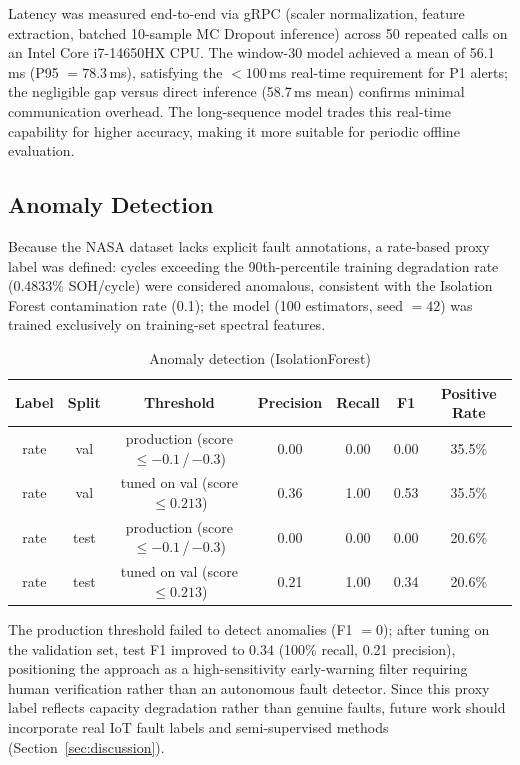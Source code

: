 Latency was measured end-to-end via gRPC (scaler normalization, feature
extraction, batched 10-sample MC Dropout inference) across 50 repeated calls on
an Intel Core i7-14650HX CPU. The window-30 model achieved a mean of 56.1\,ms
(P95 $= 78.3$\,ms), satisfying the $<100$\,ms real-time requirement for P1
alerts; the negligible gap versus direct inference (58.7\,ms mean) confirms
minimal communication overhead. The long-sequence model trades this real-time
capability for higher accuracy, making it more suitable for periodic offline
evaluation.

\subsection{Anomaly Detection}
\label{subsec:anomaly}

Because the NASA dataset lacks explicit fault annotations, a rate-based proxy
label was defined: cycles exceeding the 90th-percentile training degradation
rate (0.4833\% SOH/cycle) were considered anomalous, consistent with the
Isolation Forest contamination rate (0.1); the model (100 estimators, seed
$= 42$) was trained exclusively on training-set spectral features.

\begin{table}[H]
  \caption{Anomaly detection (IsolationForest)}
  \label{tab:anomaly}
  \centering
  \scriptsize
  \setlength{\tabcolsep}{4pt}
  \begin{tabular}{|c|c|c|c|c|c|c|}
    \hline
    \textbf{Label} & \textbf{Split} & \textbf{Threshold} &
    \textbf{Precision} & \textbf{Recall} & \textbf{F1} &
    \textbf{Positive Rate} \\
    \hline
    rate & val  & production (score $\le -0.1$\,/\,$-0.3$)
         & 0.00 & 0.00 & 0.00 & 35.5\% \\
    rate & val  & tuned on val (score $\le 0.213$)
         & 0.36 & 1.00 & 0.53 & 35.5\% \\
    rate & test & production (score $\le -0.1$\,/\,$-0.3$)
         & 0.00 & 0.00 & 0.00 & 20.6\% \\
    rate & test & tuned on val (score $\le 0.213$)
         & 0.21 & 1.00 & 0.34 & 20.6\% \\
    \hline
  \end{tabular}
\end{table}

The production threshold failed to detect anomalies (F1 $= 0$); after tuning on
the validation set, test F1 improved to 0.34 (100\% recall, 0.21 precision),
positioning the approach as a high-sensitivity early-warning filter requiring
human verification rather than an autonomous fault detector. Since this proxy
label reflects capacity degradation rather than genuine faults, future work
should incorporate real IoT fault labels and semi-supervised methods
(Section~\ref{sec:discussion}).
